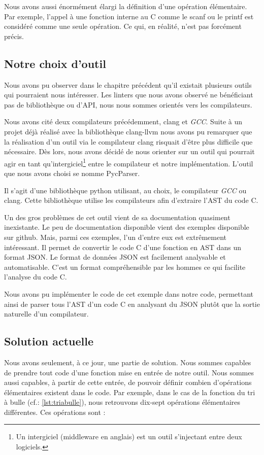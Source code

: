 \documentclass[12pt, twoside, openright]{report}
\begin{document}
Nous avons aussi énormément élargi la définition d'une opération élémentaire. Par exemple, l'appel à une fonction interne au C comme le scanf ou le printf est considéré comme une seule opération. Ce qui, en réalité, n'est pas forcément précis.

\subsection{Notre choix d'outil}

Nous avons pu observer dans le chapitre précédent qu'il existait plusieurs outils qui pourraient nous intéresser. Les linters que nous avons observé ne bénéficiant pas de bibliothèque ou d'API, nous nous sommes orientés vers les compilateurs. 

Nous avons cité deux compilateurs précédemment, clang et \textit{GCC}. Suite à un projet déjà réalisé avec la bibliothèque clang-llvm nous avons pu remarquer que la réalisation d'un outil via le compilateur clang risquait d'être plus difficile que nécessaire. Dès lors, nous avons décidé de nous orienter sur un outil qui pourrait agir en tant qu'intergiciel\footnote{Un intergiciel (middleware en anglais) est un outil s'injectant entre deux logiciels.} entre le compilateur et notre implémentation. L'outil que nous avons choisi se nomme PycParser\cite{pycparser01}.

Il s'agit d'une bibliothèque python utilisant, au choix, le compilateur \textit{GCC} ou clang. Cette bibliothèque utilise les compilateurs afin d'extraire l'AST du code C. 

Un des gros problèmes de cet outil vient de sa documentation quasiment inexistante. Le peu de documentation disponible vient des exemples disponible sur github. Mais, parmi ces exemples, l'un d'entre eux est extrêmement intéressant. Il permet de convertir le code C d'une fonction en AST dans un format JSON. Le format de données JSON est facilement analysable et automatisable. C'est un format compréhensible par les hommes ce qui facilite l'analyse du code C.  

Nous avons pu implémenter le code de cet exemple dans notre code, permettant ainsi de parser tous l'AST d'un code C en analysant du JSON plutôt que la sortie naturelle d'un compilateur.

\subsection{Solution actuelle }

Nous avons seulement, à ce jour, une partie de solution. Nous sommes capables de prendre tout code d'une fonction mise en entrée de notre outil. Nous sommes aussi capables, à partir de cette entrée, de pouvoir définir combien d'opérations élémentaires existent dans le code. Par exemple, dans le cas de la fonction du tri à bulle (cf.: \ref{lst:triabulle}), nous retrouvons dix-sept opérations élémentaires différentes. Ces opérations sont : 
\end{document}
